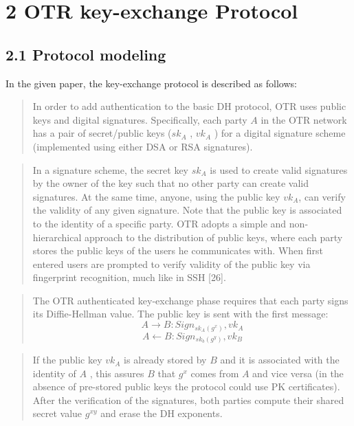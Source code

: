 \documentclass[
]{article}
\author{}
\date{}
\begin{document}
\hypertarget{otr-key-exchange-protocol}{%
\section{2 OTR key-exchange Protocol}\label{otr-key-exchange-protocol}}

\hypertarget{protocol-modeling}{%
\subsection{2.1 Protocol modeling}\label{protocol-modeling}}

In the given paper, the key-exchange protocol is described as follows:

\begin{quote}
In order to add authentication to the basic DH protocol, OTR uses public keys and digital signatures. Specifically, each party $A$  in the OTR network has a pair of secret/public keys ($sk_A$ , $vk_A$ ) for a digital signature scheme (implemented using either DSA or RSA signatures).
\end{quote}

\begin{quote}
In a signature scheme, the secret key $sk_A$ is used to create valid signatures by the owner of the key such that no other party can create valid signatures. At the same time, anyone, using the public key $vk_A$, can verify the validity of any given signature. Note that the public key is associated to the identity of a specific party. OTR adopts a simple and non-hierarchical approach to the distribution of public keys, where each party stores the public keys of the users he communicates with. When first entered users are prompted to verify validity of the public key via fingerprint recognition, much like in SSH {[}26{]}.
\end{quote}

\begin{quote}
The OTR authenticated key-exchange phase requires that each party signs its Diffie-Hellman value. The public key is sent with the first message:
\begin{displaymath}
A \rightarrow B : Sign_{sk_A(g^x)}, vk_A
\end{displaymath}
\begin{displaymath}
A \leftarrow B : Sign_{sk_b(g^y)}, vk_B
\end{displaymath}
\end{quote}

\begin{quote}
If the public key $vk_A$ is already stored by $B$ and it is associated with the identity of $A$ , this assures $B$ that $g^x$ comes from $A$ and vice versa (in the absence of pre-stored public keys the protocol could use PK certificates). After the verification of the signatures, both parties compute their shared secret value $g^{xy}$ and erase the DH exponents.
\end{quote}
\end{document}
